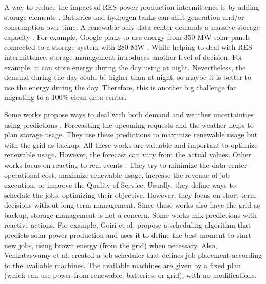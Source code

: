 A way to reduce the impact of RES power production intermittence is by adding storage elements \cite{rostirolla2022survey}. Batteries and hydrogen tanks can shift generation and/or consumption over time. A renewable-only data center demands a massive storage capacity \cite{rostirolla2022survey}. For example, Google plans to use energy from 350 MW solar panels connected to a storage system with 280 MW \cite{branscombe2020google}. While helping to deal with RES intermittence, storage management introduces another level of decision. For example, it can store energy during the day using at night. Nevertheless, the demand during the day could be higher than at night, so maybe it is better to use the energy during the day. Therefore, this is another big challenge for migrating to a 100\% clean data center.

Some works propose ways to deal with both demand and weather uncertainties using predictions \cite{wiesner2022cucumber, haddad2019mixed, lu_energy-efficient_2018, goiri2015matching}. Forecasting the upcoming requests and the weather helps to plan storage usage. They use these predictions to maximize renewable usage but with the grid as backup. All these works are valuable and important to optimize renewable usage. However, the forecast can vary from the actual values. Other works focus on reacting to real events \cite{liu2023online, he2022online, caux2019phase, sharma2011blink}. They try to minimize the data center operational cost, maximize renewable usage, increase the revenue of job execution, or improve the Quality of Service. Usually, they define ways to schedule the jobs, optimizing their objective. However, they focus on short-term decisions without long-term management. Since these works also have the grid as backup, storage management is not a concern. Some works mix predictions with reactive actions. For example, Goiri et al. \cite{goiri2015matching} propose a scheduling algorithm that predicts solar power production and uses it to define the best moment to start new jobs, using brown energy (from the grid) when necessary. Also, Venkataswamy et al. \cite{venkataswamy2023rare} created a job scheduler that defines job placement according to the available machines. The available machines are given by a fixed plan (which can use power from renewable, batteries, or grid), with no modifications.

